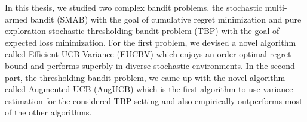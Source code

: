 In this thesis, we studied two complex bandit problems, the stochastic multi-armed bandit (SMAB) with the goal of cumulative regret minimization and pure exploration stochastic thresholding bandit problem (TBP) with the goal of expected loss minimization. For the first problem, we devised a novel algorithm called Efficient UCB Variance (EUCBV) which enjoys an order optimal regret bound and performs superbly in diverse stochastic environments. In the second part, the thresholding bandit problem, we came up with the novel algorithm called Augmented UCB (AugUCB) which is the first algorithm to use variance estimation for the considered TBP setting and also empirically outperforms most of the other algorithms. 


%    
    
